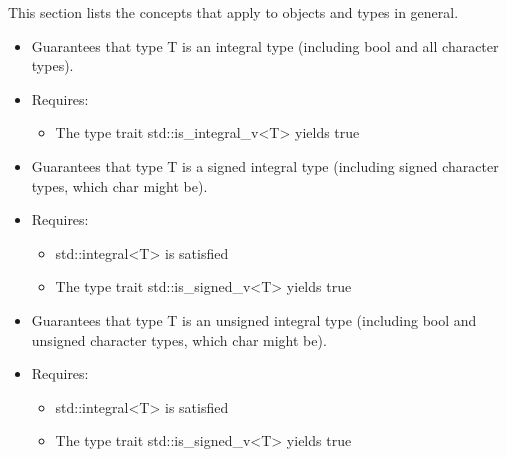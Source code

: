 

This section lists the concepts that apply to objects and types in general.



\begin{itemize}
\item
Guarantees that type T is an integral type (including bool and all character types).

\item
Requires:
\begin{itemize}
\item
The type trait std::is\_integral\_v<T> yields true
\end{itemize}
\end{itemize}



\begin{itemize}
\item
Guarantees that type T is a signed integral type (including signed character types, which char might be).

\item
Requires:
\begin{itemize}
\item
std::integral<T> is satisfied

\item
The type trait std::is\_signed\_v<T> yields true
\end{itemize}
\end{itemize}


\begin{itemize}
\item
Guarantees that type T is an unsigned integral type (including bool and unsigned character types, which char might be).

\item
Requires:
\begin{itemize}
\item
std::integral<T> is satisfied

\item
The type trait std::is\_signed\_v<T> yields true
\end{itemize}
\end{itemize}


